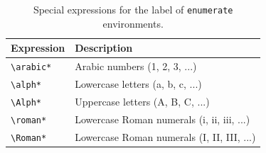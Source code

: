 \documentclass[a4paper, 12pt]{report}
\def\tbs{\textbackslash}
\begin{document}
    \begin{table}[h]
        \centering
        \begin{tabular}{ll}
            \toprule
            \textbf{Expression} & \textbf{Description} \\
            \midrule
            \texttt{\tbs{}arabic*} & Arabic numbers (1, 2, 3, ...) \\
            \texttt{\tbs{}alph*} & Lowercase letters (a, b, c, ...) \\
            \texttt{\tbs{}Alph*} & Uppercase letters (A, B, C, ...) \\
            \texttt{\tbs{}roman*} & Lowercase Roman numerals (i, ii, iii, ...) \\
            \texttt{\tbs{}Roman*} & Lowercase Roman numerals (I, II, III, ...) \\
            \bottomrule
        \end{tabular}
        \caption{Special expressions for the label of \texttt{enumerate} environments.}
        \label{tab:enumerate_special_expressions}
    \end{table}
\end{document}
